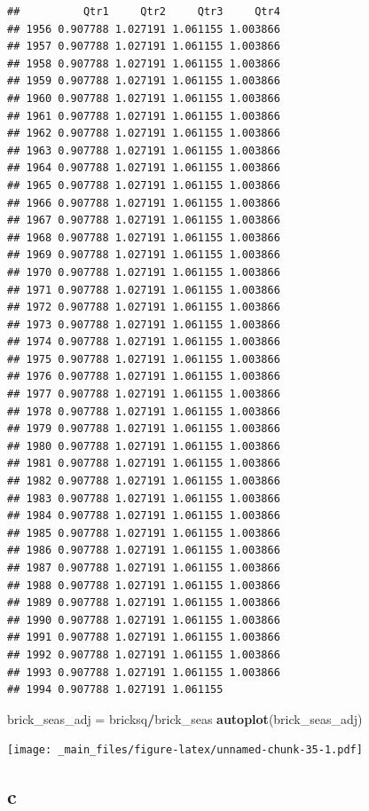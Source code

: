 \documentclass[]{book}
\newenvironment{Shaded}{\begin{snugshade}}{\end{snugshade}}
\newcommand{\KeywordTok}[1]{\textcolor[rgb]{0.13,0.29,0.53}{\textbf{#1}}}
\newcommand{\NormalTok}[1]{#1}
\newcommand{\OperatorTok}[1]{\textcolor[rgb]{0.81,0.36,0.00}{\textbf{#1}}}
\newcommand{\StringTok}[1]{\textcolor[rgb]{0.31,0.60,0.02}{#1}}
\begin{document}
\begin{verbatim}
##          Qtr1     Qtr2     Qtr3     Qtr4
## 1956 0.907788 1.027191 1.061155 1.003866
## 1957 0.907788 1.027191 1.061155 1.003866
## 1958 0.907788 1.027191 1.061155 1.003866
## 1959 0.907788 1.027191 1.061155 1.003866
## 1960 0.907788 1.027191 1.061155 1.003866
## 1961 0.907788 1.027191 1.061155 1.003866
## 1962 0.907788 1.027191 1.061155 1.003866
## 1963 0.907788 1.027191 1.061155 1.003866
## 1964 0.907788 1.027191 1.061155 1.003866
## 1965 0.907788 1.027191 1.061155 1.003866
## 1966 0.907788 1.027191 1.061155 1.003866
## 1967 0.907788 1.027191 1.061155 1.003866
## 1968 0.907788 1.027191 1.061155 1.003866
## 1969 0.907788 1.027191 1.061155 1.003866
## 1970 0.907788 1.027191 1.061155 1.003866
## 1971 0.907788 1.027191 1.061155 1.003866
## 1972 0.907788 1.027191 1.061155 1.003866
## 1973 0.907788 1.027191 1.061155 1.003866
## 1974 0.907788 1.027191 1.061155 1.003866
## 1975 0.907788 1.027191 1.061155 1.003866
## 1976 0.907788 1.027191 1.061155 1.003866
## 1977 0.907788 1.027191 1.061155 1.003866
## 1978 0.907788 1.027191 1.061155 1.003866
## 1979 0.907788 1.027191 1.061155 1.003866
## 1980 0.907788 1.027191 1.061155 1.003866
## 1981 0.907788 1.027191 1.061155 1.003866
## 1982 0.907788 1.027191 1.061155 1.003866
## 1983 0.907788 1.027191 1.061155 1.003866
## 1984 0.907788 1.027191 1.061155 1.003866
## 1985 0.907788 1.027191 1.061155 1.003866
## 1986 0.907788 1.027191 1.061155 1.003866
## 1987 0.907788 1.027191 1.061155 1.003866
## 1988 0.907788 1.027191 1.061155 1.003866
## 1989 0.907788 1.027191 1.061155 1.003866
## 1990 0.907788 1.027191 1.061155 1.003866
## 1991 0.907788 1.027191 1.061155 1.003866
## 1992 0.907788 1.027191 1.061155 1.003866
## 1993 0.907788 1.027191 1.061155 1.003866
## 1994 0.907788 1.027191 1.061155
\end{verbatim}

\begin{Shaded}
\begin{Highlighting}[]
\NormalTok{brick_seas_adj =}\StringTok{ }\NormalTok{bricksq}\OperatorTok{/}\NormalTok{brick_seas}
\KeywordTok{autoplot}\NormalTok{(brick_seas_adj)}
\end{Highlighting}
\end{Shaded}

\texttt{[image: \_main\_files/figure-latex/unnamed-chunk-35-1.pdf]}

\hypertarget{c-3}{%
\subsection{c}\label{c-3}}
\end{document}
